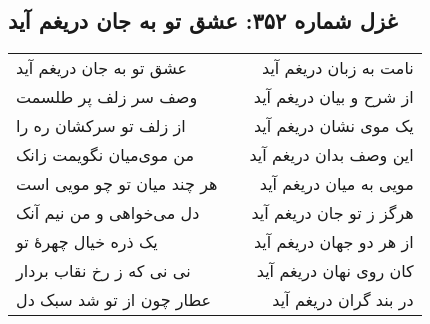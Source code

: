 \begin{center}
\section*{غزل شماره ۳۵۲: عشق تو به جان دریغم آید}
\label{sec:352}
\begin{longtable}{l p{0.5cm} r}
عشق تو به جان دریغم آید
&&
نامت به زبان دریغم آید
\\
وصف سر زلف پر طلسمت
&&
از شرح و بیان دریغم آید
\\
از زلف تو سرکشان ره را
&&
یک موی نشان دریغم آید
\\
من موی‌میان نگویمت زانک
&&
این وصف بدان دریغم آید
\\
هر چند میان تو چو مویی است
&&
مویی به میان دریغم آید
\\
دل می‌خواهی و من نیم آنک
&&
هرگز ز تو جان دریغم آید
\\
یک ذره خیال چهرهٔ تو
&&
از هر دو جهان دریغم آید
\\
نی نی که ز رخ نقاب بردار
&&
کان روی نهان دریغم آید
\\
عطار چون از تو شد سبک دل
&&
در بند گران دریغم آید
\\
\end{longtable}
\end{center}
